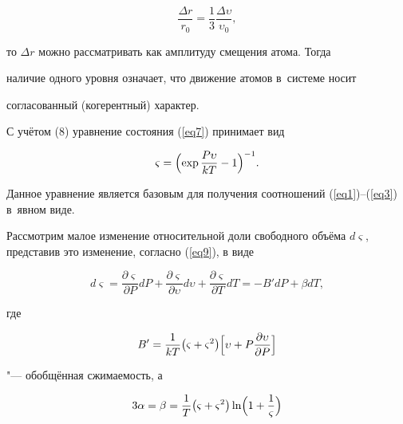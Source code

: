 \begin{equation}

\label{eq8}

\frac{\Delta r}{r_0 }=\frac13\frac{\Delta \upsilon }{\upsilon _0 },

\end{equation}

то $\Delta r$ можно рассматривать как амплитуду смещения атома. Тогда 

наличие одного уровня означает, что движение атомов в~системе носит 

согласованный (когерентный) характер.



С учётом (8) уравнение состояния (\ref{eq7}) принимает вид

\begin{equation}

\label{eq9}

\varsigma =\Bigl( \exp \frac{P\upsilon }{kT}-1 \Bigr)^{-1}.

\end{equation}

Данное уравнение является базовым для получения соотношений (\ref{eq1})--(\ref{eq3}) в~явном виде.



Рассмотрим малое изменение относительной доли свободного объёма $d\varsigma$, представив это изменение, согласно (\ref{eq9}), в виде

\begin{equation}

\label{eq10}

d\varsigma =\frac{\partial \varsigma }{\partial P}dP+\frac{\partial 

\varsigma }{\partial \upsilon }d\upsilon +\frac{\partial \varsigma 

}{\partial T}dT=-B'dP+\beta dT,

\end{equation}

где 

\begin{equation}

B'=\frac1{kT}\bigl( \varsigma +\varsigma ^2 \bigr)

\Bigl[ 

\upsilon +P\frac{\partial \upsilon }{\partial P} \Bigr]

\end{equation}

"--- обобщённая сжимаемость, а

\begin{equation}

3\alpha =\beta =\frac1T

\bigl(\varsigma +\varsigma ^2\bigr)\ln 

\Bigl( 1+\frac1\varsigma \Bigr) 

\end{equation}

